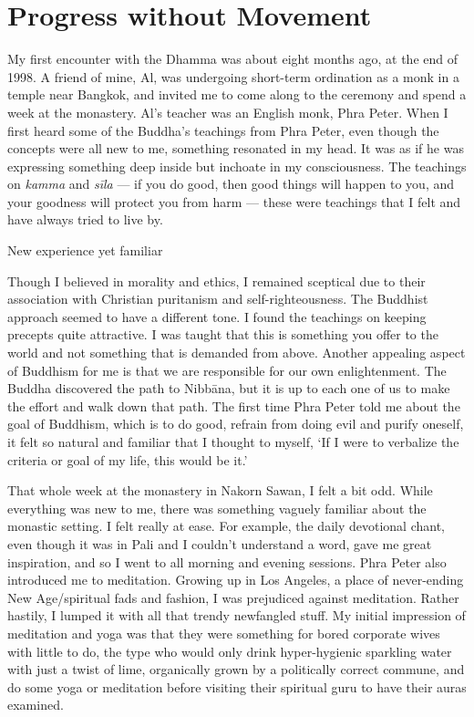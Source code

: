 

\chapter{Progress without Movement}
\markright{\chapterAuthor}

My first encounter with the Dhamma was about eight months ago, at the
end of 1998. A friend of mine, Al, was undergoing short-term ordination
as a monk in a temple near Bangkok, and invited me to come along to the
ceremony and spend a week at the monastery. Al's teacher was an English
monk, Phra Peter. When I first heard some of the Buddha's teachings from
Phra Peter, even though the concepts were all new to me, something
resonated in my head. It was as if he was expressing something deep
inside but inchoate in my consciousness. The teachings on \emph{kamma}
and \emph{sīla} --- if you do good, then good things will happen to you,
and your goodness will protect you from harm --- these were teachings
that I felt and have always tried to live by.

New experience yet familiar

Though I believed in morality and ethics, I remained sceptical due to
their association with Christian puritanism and self-righteousness. The
Buddhist approach seemed to have a different tone. I found the teachings
on keeping precepts quite attractive. I was taught that this is
something you offer to the world and not something that is demanded from
above. Another appealing aspect of Buddhism for me is that we are
responsible for our own enlightenment. The Buddha discovered the path to
Nibbāna, but it is up to each one of us to make the effort and walk down
that path. The first time Phra Peter told me about the goal of Buddhism,
which is to do good, refrain from doing evil and purify oneself, it felt
so natural and familiar that I thought to myself, `If I were to
verbalize the criteria or goal of my life, this would be it.'

That whole week at the monastery in Nakorn Sawan, I felt a bit odd.
While everything was new to me, there was something vaguely familiar
about the monastic setting. I felt really at ease. For example, the
daily devotional chant, even though it was in Pali and I couldn't
understand a word, gave me great inspiration, and so I went to all
morning and evening sessions. Phra Peter also introduced me to
meditation. Growing up in Los Angeles, a place of never-ending New
Age/spiritual fads and fashion, I was prejudiced against meditation.
Rather hastily, I lumped it with all that trendy newfangled stuff. My
initial impression of meditation and yoga was that they were something
for bored corporate wives with little to do, the type who would only
drink hyper-hygienic sparkling water with just a twist of lime,
organically grown by a politically correct commune, and do some yoga or
meditation before visiting their spiritual guru to have their auras
examined.

